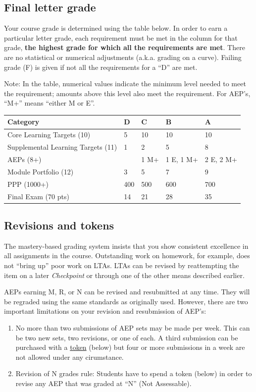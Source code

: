 \hypertarget{final-letter-grade}{%
\subsection{Final letter grade}\label{final-letter-grade}}

Your course grade is determined using the table below. In order to earn
a particular letter grade, each requirement must be met in the column
for that grade, \textbf{the highest grade for which all the requirements
are met}. There are no statistical or numerical adjustments (a.k.a.
grading on a curve). Failing grade (F) is given if not all the
requirements for a ``D'' are met.

Note: In the table, numerical values indicate the minimum level needed
to meet the requirement; amounts above this level also meet the
requirement. For AEP's, ``M+'' means ``either M or E''.

\begin{longtable}[]{@{}lllll@{}}
\toprule
Category & D & C & B & A\tabularnewline
\midrule
\endhead
Core Learning Targets (10) & 5 & 10 & 10 & 10\tabularnewline
Supplemental Learning Targets (11) & 1 & 2 & 5 & 8\tabularnewline
AEPs (8+) & & 1 M+ & 1 E, 1 M+ & 2 E, 2 M+\tabularnewline
Module Portfolio (12) & 3 & 5 & 7 & 9\tabularnewline
PPP (1000+) & 400 & 500 & 600 & 700\tabularnewline
Final Exam (70 pts) & 14 & 21 & 28 & 35\tabularnewline
\bottomrule
\end{longtable}

\hypertarget{revisions}{%
\subsection{Revisions and tokens}\label{revisions}}

The mastery-based grading system insists that you show consistent
excellence in all assignments in the course. Outstanding work on
homework, for example, does not ``bring up'' poor work on LTAs. LTAs can
be revised by reattempting the item on a later \emph{Checkpoint} or
through one of the other means described earlier.

AEPs earning M, R, or N can be revised and resubmitted at any time. They
will be regraded using the same standards as originally used. However,
there are two important limitations on your revision and resubmission of
AEP's:

\begin{enumerate}
\def\labelenumi{\arabic{enumi}.}
\tightlist
\item
  No more than two submissions of AEP sets may be made per week. This
  can be two new sets, two revisions, or one of each. A third submission
  can be purchased with a \protect\hyperlink{tokens}{token} (below) but
  four or more submissions in a week are not allowed under any
  cirumstance.
\item
  Revision of N grades rule: Students have to spend a token (below) in
  order to revise any AEP that was graded at ``N'' (Not Assessable).
\end{enumerate}

